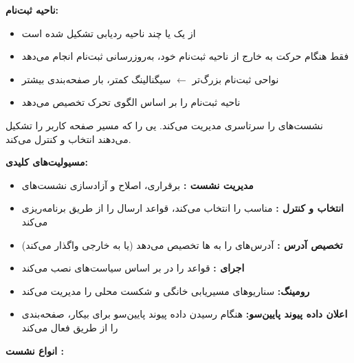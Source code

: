 \textbf{ناحیه ثبت‌نام:}

\begin{itemize}
\tightlist
\item
  از یک یا چند ناحیه ردیابی  تشکیل شده است
\item
   فقط هنگام حرکت به خارج از ناحیه ثبت‌نام خود، به‌روزرسانی ثبت‌نام انجام می‌دهد
\item
  نواحی ثبت‌نام بزرگ‌تر \ensuremath{\leftarrow} سیگنالینگ کمتر، بار صفحه‌بندی بیشتر
\item
   ناحیه ثبت‌نام را بر اساس الگوی تحرک  تخصیص می‌دهد
\end{itemize}


 نشست‌های  را سرتاسری مدیریت می‌کند. یی را که مسیر صفحه کاربر را تشکیل می‌دهند انتخاب و کنترل می‌کند.

\textbf{مسیولیت‌های کلیدی:}

\begin{itemize}
\tightlist
\item
  \textbf{مدیریت نشست :} برقراری، اصلاح و آزادسازی نشست‌های 
\item
  \textbf{انتخاب و کنترل :}  مناسب را انتخاب می‌کند، قواعد ارسال را از طریق  برنامه‌ریزی می‌کند
\item
  \textbf{تخصیص آدرس :} آدرس‌های  را به ها تخصیص می‌دهد (یا به  خارجی واگذار می‌کند)
\item
  \textbf{اجرای :} قواعد  را در  بر اساس سیاست‌های  نصب می‌کند
\item
  \textbf{رومینگ:} سناریوهای مسیریابی خانگی و شکست محلی را مدیریت می‌کند
\item
  \textbf{اعلان داده پیوند پایین‌سو:} هنگام رسیدن داده پیوند پایین‌سو برای  بیکار، صفحه‌بندی را از طریق  فعال می‌کند
\end{itemize}


\textbf{انواع نشست :}

